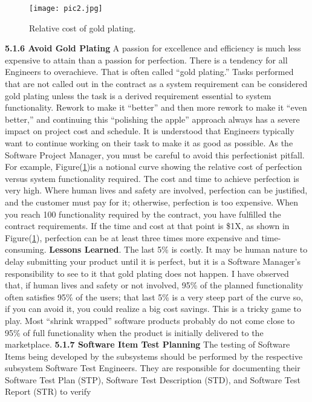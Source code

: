 \documentclass{book}
\begin{document}
	\begin{figure}[h]
	\centering
	\texttt{[image: pic2.jpg]}
	\caption{Relative cost of gold plating.}
	\label{pic2}
\end{figure}
\begin{multicols}{2}
\textbf{5.1.6 Avoid Gold Plating}
A passion for excellence and efficiency is much less
expensive to attain than a passion for perfection.
There is a tendency for all Engineers to overachieve. That
is often called “gold plating.” Tasks performed that are not
called out in the contract as a system requirement can be
considered gold plating unless the task is a derived requirement essential to system functionality. Rework to make it
“better” and then more rework to make it “even better,” and
continuing this “polishing the apple” approach always has a
severe impact on project cost and schedule. It is understood
that Engineers typically want to continue working on their
task to make it as good as possible. As the Software Project Manager, you must be careful to avoid this perfectionist pitfall.
For example, Figure(\ref{pic2})is a notional curve showing the relative cost of perfection versus system functionality required.
The cost and time to achieve perfection is very high.
Where human lives and safety are involved, perfection
can be justified, and the customer must pay for it; otherwise, perfection is too expensive. When you reach 100%
functionality required by the contract, you have fulfilled the
contract requirements. If the time and cost at that point is
\$1X, as shown in Figure(\ref{pic2}), perfection can be at least three
times more expensive and time-consuming.
\textbf{Lessons Learned}. The last 5\% is costly. It may be
human nature to delay submitting your product
until it is perfect, but it is a Software Manager’s
responsibility to see to it that gold plating does
not happen. I have observed that, if human lives
and safety or not involved, 95\% of the planned
functionality often satisfies 95\% of the users;
that last 5\% is a very steep part of the curve so, if
you can avoid it, you could realize a big cost savings. This is a tricky game to play. Most “shrink
wrapped” software products probably do not
come close to 95\% of full functionality when the
product is initially delivered to the marketplace.
\textbf{5.1.7 Software Item Test Planning}
The testing of Software Items being developed by the subsystems should be performed by the respective subsystem Software Test Engineers. They are responsible for documenting their Software Test Plan (STP), Software Test
Description (STD), and Software Test Report (STR) to verify

\end{multicols}
\end{document}
